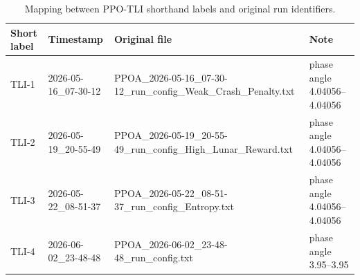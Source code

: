 \begin{table}[!t]
\centering
\caption{Mapping between PPO-TLI shorthand labels and original run identifiers.}
\label{tab:tli_run_key}
\renewcommand{\arraystretch}{1.1}
\scriptsize
\begin{tabular*}{\textwidth}{@{\extracolsep{\fill}}llll}
\toprule
\textbf{Short label} & \textbf{Timestamp} & \textbf{Original file} & \textbf{Note}\\
\midrule
TLI-1 & 2026-05-16\_07-30-12 & PPOA\_2026-05-16\_07-30-12\_run\_config\_Weak\_Crash\_Penalty.txt & phase angle 4.04056--4.04056\\
TLI-2 & 2026-05-19\_20-55-49 & PPOA\_2026-05-19\_20-55-49\_run\_config\_High\_Lunar\_Reward.txt & phase angle 4.04056--4.04056\\
TLI-3 & 2026-05-22\_08-51-37 & PPOA\_2026-05-22\_08-51-37\_run\_config\_Entropy.txt & phase angle 4.04056--4.04056\\
TLI-4 & 2026-06-02\_23-48-48 & PPOA\_2026-06-02\_23-48-48\_run\_config.txt & phase angle 3.95--3.95\\
\bottomrule
\end{tabular*}
\end{table}


